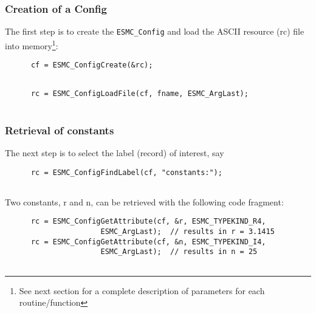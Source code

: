 
  \subsubsection{Creation of a Config}
 
   The first step is to create the {\tt ESMC\_Config} and load the
   ASCII resource (rc) file into memory\footnote{See next section
   for a complete description of parameters for each routine/function}: 

 \begin{verbatim}
      cf = ESMC_ConfigCreate(&rc);
 
\end{verbatim}
 

 \begin{verbatim}
      rc = ESMC_ConfigLoadFile(cf, fname, ESMC_ArgLast);
 
\end{verbatim}
 

  \subsubsection{Retrieval of constants}
 
   The next step is to select the label (record) of interest, say 

 \begin{verbatim}
      rc = ESMC_ConfigFindLabel(cf, "constants:");
 
\end{verbatim}
 

   Two constants, r and n, can be retrieved with the following code
   fragment: 

 \begin{verbatim}
      rc = ESMC_ConfigGetAttribute(cf, &r, ESMC_TYPEKIND_R4,
                      ESMC_ArgLast);  // results in r = 3.1415
      rc = ESMC_ConfigGetAttribute(cf, &n, ESMC_TYPEKIND_I4,
                      ESMC_ArgLast);  // results in n = 25
 
\end{verbatim}
 
